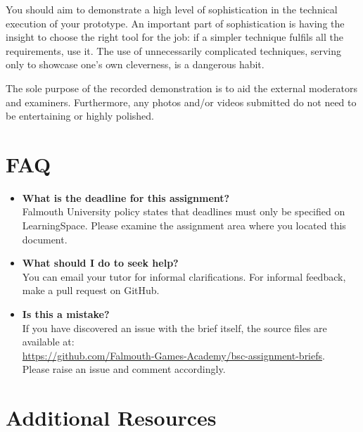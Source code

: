 \documentclass{../fal_assignment}
\begin{document}
You should aim to demonstrate a high level of sophistication in the technical execution of your prototype. An important part of sophistication is having the insight to choose the right tool for the job: if a simpler technique fulfils all the requirements, use it. The use of unnecessarily complicated techniques, serving only to showcase one's own cleverness, is a dangerous habit. 

The sole purpose of the recorded demonstration is to aid the external moderators and examiners. Furthermore, any photos and/or videos submitted do not need to be entertaining or highly polished.

\section*{FAQ}

\begin{itemize}
	\item 	\textbf{What is the deadline for this assignment?} \\ 
    		Falmouth University policy states that deadlines must only be specified on LearningSpace. Please examine the assignment area where you located this document.
    		
	\item 	\textbf{What should I do to seek help?} \\ 
    		You can email your tutor for informal clarifications. For informal feedback, make a pull request on GitHub. 
    		
    	\item 	\textbf{Is this a mistake?} \\ 	
    		If you have discovered an issue with the brief itself, the source files are available at: \\
    		\url{https://github.com/Falmouth-Games-Academy/bsc-assignment-briefs}.\\
    		 Please raise an issue and comment accordingly.
\end{itemize}

\section*{Additional Resources}
\end{document}

